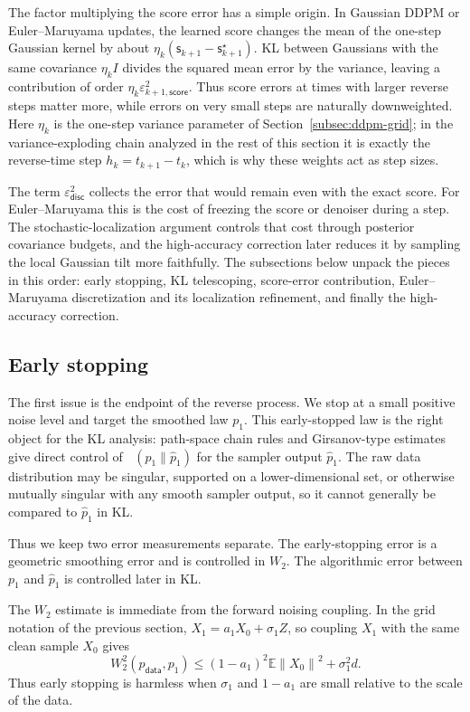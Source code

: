 \documentclass{amsart}
\numberwithin{equation}{section}
\theoremstyle{plain}
\theoremstyle{definition}
\theoremstyle{remark}
\DeclareMathOperator{\KL}{D_{\mathsf{KL}}}
\newcommand{\E}{\mathbb{E}}
\newcommand{\Id}{I}
\newcommand{\wh}[1]{\widehat{#1}}
\newcommand{\eps}{\varepsilon}
\newcommand{\norm}[1]{\left\lVert #1 \right\rVert}
\newcommand{\pdata}{p_{\mathsf{data}}}
\newcommand{\sstar}{\mathsf{s}^{\star}}
\newcommand{\score}{\mathsf{s}}
\newcommand{\epsdisc}{\varepsilon_{\mathsf{disc}}}
\begin{document}
The factor multiplying the score error has a simple origin.  In Gaussian DDPM
or Euler--Maruyama updates, the learned score changes the mean of the one-step
Gaussian kernel by about $\eta_k(\score_{k+1}-\sstar_{k+1})$.  KL between
Gaussians with the same covariance $\eta_k\Id$ divides the squared mean error by
the variance, leaving a contribution of order
$\eta_k\eps_{k+1,\mathsf{score}}^2$.  Thus score errors at times with
larger reverse steps matter more, while errors on very small steps are naturally
downweighted.  Here $\eta_k$ is the one-step variance parameter of
Section~\ref{subsec:ddpm-grid}; in the variance-exploding chain analyzed in the
rest of this section it is exactly the reverse-time step $h_k=t_{k+1}-t_k$, which
is why these weights act as step sizes.

The term $\epsdisc^2$ collects the error that would remain even
with the exact score.  For Euler--Maruyama this is the cost of freezing the score
or denoiser during a step.  The stochastic-localization argument controls that
cost through posterior covariance budgets, and the high-accuracy correction later
reduces it by sampling the local Gaussian tilt more faithfully.  The subsections
below unpack the pieces in this order: early stopping, KL telescoping,
score-error contribution, Euler--Maruyama discretization and its localization
refinement, and finally the high-accuracy correction.

\subsection{Early stopping}

The first issue is the endpoint of the reverse process.  We stop at a small
positive noise level and target the smoothed law $p_1$.  This
early-stopped law is the right object for the KL analysis: path-space chain
rules and Girsanov-type estimates give direct control of $\KL(p_1\|\wh p_1)$
for the sampler output $\wh p_1$.  The raw data distribution may be singular,
supported on a lower-dimensional set, or otherwise mutually singular with any
smooth sampler output, so it cannot generally be compared to $\wh p_1$ in KL.

Thus we keep two error measurements separate.  The early-stopping error is a
geometric smoothing error and is controlled in $W_2$.  The algorithmic error
between $p_1$ and $\wh p_1$ is controlled later in KL.

The $W_2$ estimate is immediate from the forward noising coupling.  In the
grid notation of the previous section, $X_1=a_1X_0+\sigma_1Z$, so coupling
$X_1$ with the same clean sample $X_0$ gives
\begin{equation}\label{eq:early-stop-w2}
    W_2^2(\pdata,p_1)
    \leq
    (1-a_1)^2\E\norm{X_0}^2+\sigma_1^2d.
\end{equation}
Thus early stopping is harmless when $\sigma_1$ and $1-a_1$ are small relative
to the scale of the data.
\end{document}
